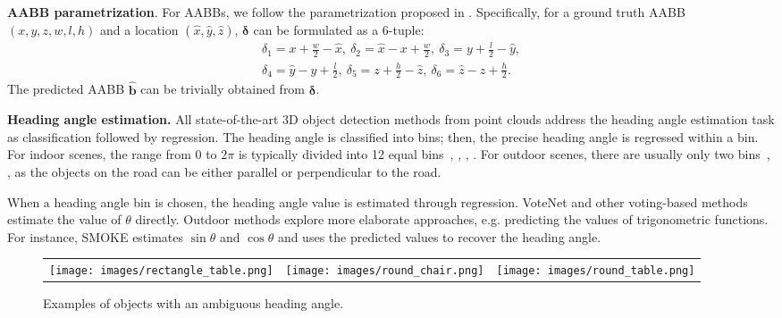 \documentclass[runningheads]{llncs}
\begin{document}
\textbf{AABB parametrization}. For AABBs, we follow the parametrization proposed in \cite{rukhovich2021imvoxelnet}. Specifically, for a ground truth AABB $(x, y, z, w, l, h)$ and a location $(\hat{x}, \hat{y}, \hat{z})$, $\boldsymbol{\delta}$ can be formulated as a 6-tuple:
\begin{equation}\label{eq:delta1-6}\begin{split}
    \delta_1=x + \frac{w}{2} - \hat{x},\ \delta_2=\hat{x} - x + \frac{w}{2},\ \delta_3=y + \frac{l}{2} - \hat{y}, \\
    \delta_4=\hat{y} - y + \frac{l}{2},\ \delta_5=z + \frac{h}{2} - \hat{z},\ \delta_6=\hat{z} - z + \frac{h}{2}.
\end{split}\end{equation}
The predicted AABB $\boldsymbol{\hat{b}}$ can be trivially obtained from $\boldsymbol{\delta}$.

\textbf{Heading angle estimation.} All state-of-the-art 3D object detection methods from point clouds address the heading angle estimation task as classification followed by regression. The heading angle is classified into bins; then, the precise heading angle is regressed within a bin. For indoor scenes, the range from 0 to $2 \pi$ is typically divided into 12 equal bins~\cite{qi2019votenet}, \cite{qi2020imvotenet}, \cite{zhang2020h3dnet}, \cite{misra20213detr}. For outdoor scenes, there are usually only two bins~\cite{yan2018second}, \cite{lang2019pointpillars}, as the objects on the road can be either parallel or perpendicular to the road.

When a heading angle bin is chosen, the heading angle value is estimated through regression. VoteNet and other voting-based methods estimate the value of $\theta$ directly. Outdoor methods explore more elaborate approaches, e.g. predicting the values of trigonometric functions. For instance, SMOKE \cite{liu2020smoke} estimates $\sin \theta$ and $\cos \theta$ and uses the predicted values to recover the heading angle. 

\begin{wrapfigure}{r}{0.6\textwidth}
\setlength{\tabcolsep}{2pt}
\begin{tabular}{ccc}
    \texttt{[image: images/rectangle\_table.png]} &
    \texttt{[image: images/round\_chair.png]} &
    \texttt{[image: images/round\_table.png]}
\end{tabular}
\caption{Examples of objects with an ambiguous heading angle.}
\label{fig:direction_examples}
\end{wrapfigure}
\end{document}

